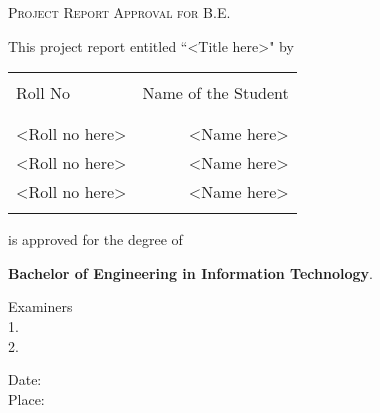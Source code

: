 \newpage

\begin{center}
    \Large \textsc {Project Report Approval for B.E.}\\[0.5cm]
\end{center}

\noindent This project report entitled ``<Title here>" by\\
\begin{table}[h]
    \centering
    \begin{tabular}{lr}\hline                           \\
        Roll No        & Name of the Student \\ \\ \hline
        \\
        <Roll no here> & <Name here>         \\
        <Roll no here> & <Name here>         \\
        <Roll no here> & <Name here>         \\ \\ \hline
    \end{tabular}
\end{table}

\noindent is approved for the degree of
\begin{center}
    \textbf{Bachelor of Engineering in Information Technology}.\\[1.5cm]
\end{center}

\begin{flushright}
    Examiners \\[0.5cm]
    1. \underline{\hspace{3cm}}\\[0.5cm]
    2. \underline{\hspace{3cm}}\\[0.5cm]
\end{flushright}

\begin{flushleft}
    Date:\\[0.5cm]
    Place:\\[0.5cm]
\end{flushleft}
